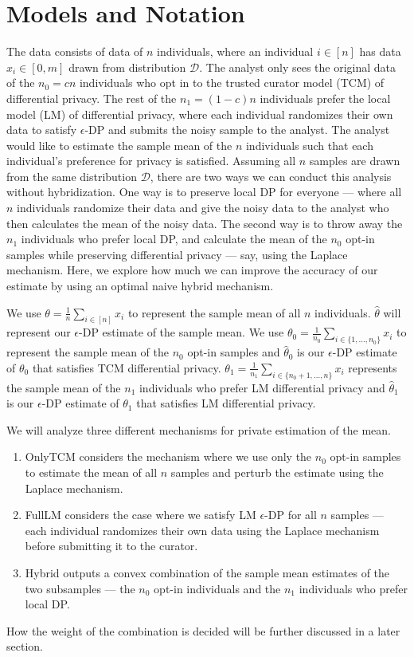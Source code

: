 \documentclass{article}
\theoremstyle{plain}
\begin{document}
\section{Models and Notation}
The data consists of data of $n$ individuals, where an individual $i \in [n]$ has data $x_i \in [0, m]$ drawn from distribution $\mathcal{D}$. The analyst only sees the original data of the $n_0 = c n$ individuals who opt in to the trusted curator model (TCM) of differential privacy. The rest of the $n_1 = (1-c) n$ individuals prefer the local model (LM) of differential privacy, where each individual randomizes their own data to satisfy $\epsilon$-DP and submits the noisy sample to the analyst. The analyst would like to estimate the sample mean of the $n$ individuals such that each individual's preference for privacy is satisfied. Assuming all $n$ samples are drawn from the same distribution $\mathcal{D}$, there are two ways we can conduct this analysis without hybridization. One way is to preserve local DP for everyone — where all $n$ individuals randomize their data and give the noisy data to the analyst who then calculates the mean of the noisy data. The second way is to throw away the $n_1$ individuals who prefer local DP, and calculate the mean of the $n_0$ opt-in samples while preserving differential privacy — say, using the Laplace mechanism. Here, we explore how much we can improve the accuracy of our estimate by using an optimal naive hybrid mechanism. 

We use $\theta = \frac{1}{n}\sum_{i \in [n]}x_i$ to represent the sample mean of all $n$ individuals. $\hat{\theta}$ will represent our $\epsilon$-DP estimate of the sample mean. We use $\theta_0 = \frac{1}{n_0}\sum_{i \in \{1, \dots, n_0\}} x_i$ to represent the sample mean of the $n_0$ opt-in samples and $\hat{\theta}_0$ is our $\epsilon$-DP estimate of $\theta_0$ that satisfies TCM differential privacy. $\theta_1 = \frac{1}{n_1}\sum_{i \in \{n_0+1, \dots, n\}} x_i$ represents the sample mean of the $n_1$ individuals who prefer LM differential privacy and $\hat{\theta}_1$ is our $\epsilon$-DP estimate of $\theta_1$ that satisfies LM differential privacy. 

We will analyze three different mechanisms for private estimation of the mean. 
\begin{enumerate}
\item OnlyTCM considers the mechanism where we use only the $n_0$ opt-in samples to estimate the mean of all $n$ samples and perturb the estimate using the Laplace mechanism. 
\item FullLM considers the case where we satisfy LM $\epsilon$-DP for all $n$ samples — each individual randomizes their own data using the Laplace mechanism before submitting it to the curator.  
\item Hybrid outputs a convex combination of the sample mean estimates of the two subsamples — the $n_0$ opt-in individuals and the $n_1$ individuals who prefer local DP.
\end{enumerate}
How the weight of the combination is decided will be further discussed in a later section. 
\end{document}

